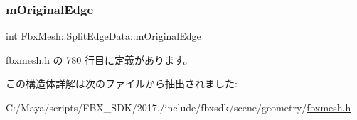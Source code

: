 \subsubsection{\texorpdfstring{m\+Original\+Edge}{mOriginalEdge}}
{\footnotesize\ttfamily int Fbx\+Mesh\+::\+Split\+Edge\+Data\+::m\+Original\+Edge}



 fbxmesh.\+h の 780 行目に定義があります。



この構造体詳解は次のファイルから抽出されました\+:\begin{DoxyCompactItemize}
\item 
C\+:/\+Maya/scripts/\+F\+B\+X\+\_\+\+S\+D\+K/2017./include/fbxsdk/scene/geometry/\hyperlink{fbxmesh_8h}{fbxmesh.\+h}\end{DoxyCompactItemize}
